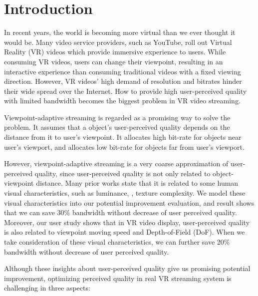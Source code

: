 \section{Introduction}

In recent years, the world is becoming more virtual than we ever thought it would be. Many video service providers, such as YouTube, roll out Virtual Reality (VR) videos which provide immersive experience to users. While consuming VR videos, users can change their viewpoint, resulting in an interactive experience than consuming traditional videos with a fixed viewing direction. However, VR videos' high demand of resolution and bitrates hinder their wide spread over the Internet. How to provide high user-perceived quality with limited bandwidth becomes the biggest problem in VR video streaming.

Viewpoint-adaptive streaming is regarded as a promising way to solve the problem. It assumes that a object's user-perceived quality depends on the distance from it to user's viewpoint\cite{distance}. It allocates high bit-rate for objects near user's viewport, and allocates low bit-rate for objects far from user's viewport. 

However, viewpoint-adaptive streaming is a very coarse approximation of user-perceived quality, since user-perceived quality is not only related to object-viewpoint distance. Many prior works state that it is related to some human visual characteristics, such as luminance\cite{PSPNR}, \cite{luminance1}, texture complexity\cite{PSPNR}. We model these visual characteristics into our potential improvement evaluation, and result shows that we can save 30\% bandwidth without decrease of user perceived quality. Moreover, our user study shows that in VR video display, user-perceived quality is also related to viewpoint moving speed and Depth-of-Field (DoF). When we take consideration of these visual characteristics, we can further save 20\% bandwidth without decrease of user perceived quality.

Although these insights about user-perceived quality give us promising potential improvement, optimizing perceived quality in real VR streaming system is challenging in three aspects:

